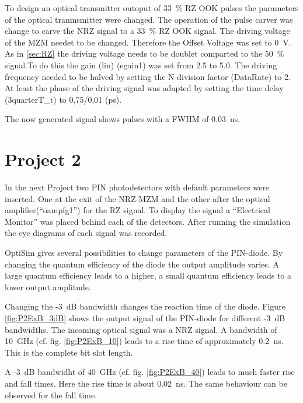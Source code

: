 To design an optical transmitter outoput of 33~\% RZ OOK pulses the parameters of the optical tranmsmitter were changed. 
The operation of the pulse carver was change to carve the NRZ signal to a 33~\% RZ OOK signal. The driving voltage of the MZM needet to be changed. Therefore the Offset Voltage was set to 0~V. As in \ref{sec:RZ} the driving voltage needs to be doublet comparted to the 50~\% signal.To do this the gain (lin) (egain1) was set from 2.5 to 5.0. The driving frequency needed to be halved by setting the N-division factor (DataRate) to 2.
At least the phase of the driving signal was adapted by setting the time delay (3quarterT\_t) to 0,75/0,01 (ps).

The now generated signal shows pulses with a FWHM of 0.03~ns.



\section{Project 2}
In the next Project two PIN photodetectors with default parameters were inserted. One at the exit of the NRZ-MZM and the other after the optical amplifier("`oampfg1"') for the RZ signal. To display the signal a "`Electrical Monitor"' was placed behind each of the detectors. After running the simulation the eye diagrams of each signal was recorded. 


OptiSim gives several possibilities to change parameters of the PIN-diode. 
By changing the quantum efficiency of the diode the output amplitude varies. A large quantum efficiency leads to a higher, a small quantum efficiency leads to a lower output amplitude. 

Changing the -3~dB bandwidth changes the reaction time of the diode. 
Figure \ref{fig:P2ExB_3dB} shows the output signal of the PIN-diode for different -3~dB bandwidths. The incoming optical signal was a NRZ signal. A bandwidth of 10~GHz (cf. fig. \ref{fig:P2ExB_10}) leads to a rise-time of approximately 0.2~ns. This is the complete bit slot length.

A -3~dB bandwidht of 40~GHz (cf. fig. \ref{fig:P2ExB_40}) leads to much faster rise and fall times. Here the rise time is about 0.02~ns. The same behaviour can be observed for the fall time.

